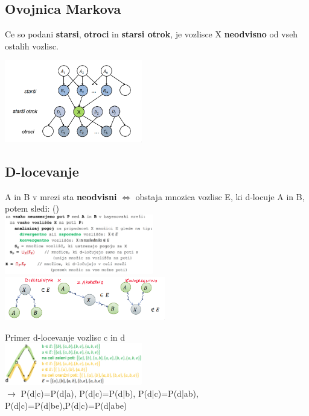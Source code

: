 \subsection{Ovojnica Markova}
Ce so podani \textbf{starsi}, \textbf{otroci} in \textbf{starsi otrok}, je vozlisce X \textbf{neodvisno} od vseh ostalih vozlisc.

\includegraphics[width=6cm]{images/ovojnica-markova.png}

\subsection{D-locevanje}

A in B v mrezi sta \textbf{neodvisni} $\Leftrightarrow$ obstaja mnozica vozlisc E, ki d-locuje A in B, potem sledi:  ()\\
\includegraphics[width=6.5cm]{images/d-locevanje-algoritem.png}
\includegraphics*[width=7cm]{images/d-locevanje-nacini.png}

Primer d-locevanje vozlisc c in d\\
\includegraphics*[width=6cm]{images/primer-d-locevanje.png}\\
$\rightarrow$ P(d|c)=P(d|a), P(d|c)=P(d|b), P(d|c)=P(d|ab),\\
P(d|c)=P(d|be),P(d|c)=P(d|abe)